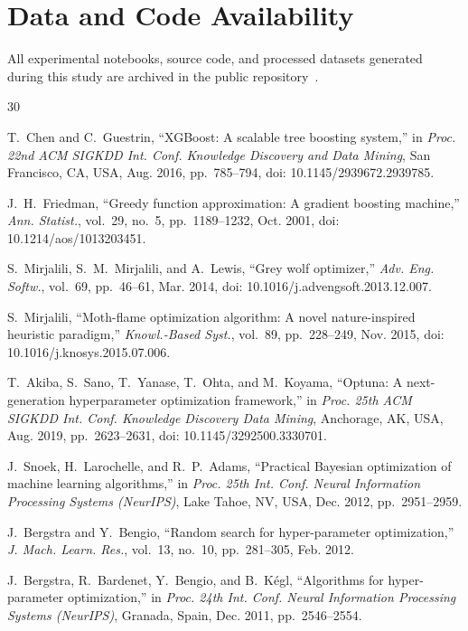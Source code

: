 \documentclass[journal]{IEEEtran}
\begin{document}
\section*{Data and Code Availability}
All experimental notebooks, source code, and processed datasets generated during this study are archived in the public repository~\cite{repo2026}.

\begin{thebibliography}{30}

T.~Chen and C.~Guestrin, ``XGBoost: A scalable tree boosting system,'' in \emph{Proc. 22nd ACM SIGKDD Int. Conf. Knowledge Discovery and Data Mining}, San Francisco, CA, USA, Aug. 2016, pp.~785--794, doi: 10.1145/2939672.2939785.

J.~H.~Friedman, ``Greedy function approximation: A gradient boosting machine,'' \emph{Ann. Statist.}, vol.~29, no.~5, pp.~1189--1232, Oct. 2001, doi: 10.1214/aos/1013203451.

S.~Mirjalili, S.~M.~Mirjalili, and A.~Lewis, ``Grey wolf optimizer,'' \emph{Adv. Eng. Softw.}, vol.~69, pp.~46--61, Mar. 2014, doi: 10.1016/j.advengsoft.2013.12.007.

S.~Mirjalili, ``Moth-flame optimization algorithm: A novel nature-inspired heuristic paradigm,'' \emph{Knowl.-Based Syst.}, vol.~89, pp.~228--249, Nov. 2015, doi: 10.1016/j.knosys.2015.07.006.

T.~Akiba, S.~Sano, T.~Yanase, T.~Ohta, and M.~Koyama, ``Optuna: A next-generation hyperparameter optimization framework,'' in \emph{Proc. 25th ACM SIGKDD Int. Conf. Knowledge Discovery Data Mining}, Anchorage, AK, USA, Aug. 2019, pp.~2623--2631, doi: 10.1145/3292500.3330701.

J.~Snoek, H.~Larochelle, and R.~P.~Adams, ``Practical Bayesian optimization of machine learning algorithms,'' in \emph{Proc. 25th Int. Conf. Neural Information Processing Systems (NeurIPS)}, Lake Tahoe, NV, USA, Dec. 2012, pp.~2951--2959.

J.~Bergstra and Y.~Bengio, ``Random search for hyper-parameter optimization,'' \emph{J. Mach. Learn. Res.}, vol.~13, no.~10, pp.~281--305, Feb. 2012.

J.~Bergstra, R.~Bardenet, Y.~Bengio, and B.~Kégl, ``Algorithms for hyper-parameter optimization,'' in \emph{Proc. 24th Int. Conf. Neural Information Processing Systems (NeurIPS)}, Granada, Spain, Dec. 2011, pp.~2546--2554.


\end{thebibliography}
\end{document}

